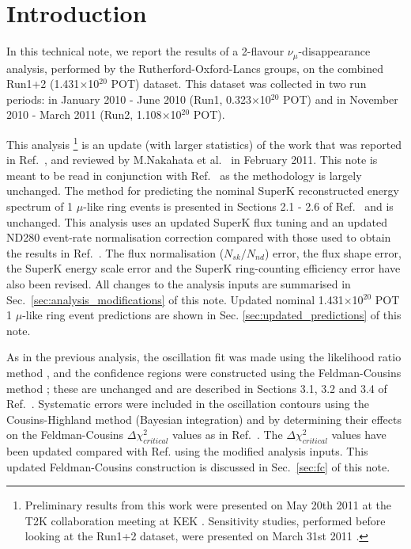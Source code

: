 \clearpage

\section {Introduction }
\label{sec:intro}

In this technical note, 
we report the results of a 2-flavour $\nu_{\mu}$-disappearance analysis,
performed by the Rutherford-Oxford-Lancs groups,	
on the combined Run1+2 (1.431$\times$10$^{20}$ POT) dataset.
This dataset was collected in two run periods:
in January 2010 - June 2010 (Run1, 0.323$\times$10$^{20}$ POT) and
in November 2010 - March 2011 (Run2, 1.108$\times$10$^{20}$ POT).

This analysis 
\footnote{
   Preliminary results from this work were presented on May 20th 2011
   at the T2K collaboration meeting at KEK \cite{OurPreliminaryResults}.
   Sensitivity studies, performed before looking at the Run1+2 dataset,
   were presented on March 31st 2011 \cite{OurSensitivityStudy}.
}
is an update (with larger statistics) of the work 
that was reported in Ref.\ \cite{OurRun1DisappAnalysis},
and reviewed by M.Nakahata et al.\ \cite{Run1DisappAnalysisReview} in February 2011.
This note is meant to be read in conjunction with Ref.\ \cite{OurRun1DisappAnalysis} as the methodology is largely unchanged.
The method for predicting the nominal SuperK reconstructed energy spectrum of 1 $\mu$-like ring events is presented 
in Sections 2.1 - 2.6 of Ref.\ \cite{OurRun1DisappAnalysis} and is unchanged.
This analysis uses an updated SuperK flux tuning and an updated 
ND280 event-rate normalisation correction compared with those used to obtain the results in Ref.\ \cite{OurRun1DisappAnalysis}.
The flux normalisation ($N_{sk}/N_{nd}$) error, the flux shape error, the SuperK energy scale error and the 
SuperK ring-counting efficiency error have also been revised.
All changes to the analysis inputs are summarised in Sec.\ \ref{sec:analysis_modifications} of this note.
Updated nominal 1.431$\times$10$^{20}$ POT 1 $\mu$-like ring event predictions are shown in 
Sec. \ref{sec:updated_predictions} of this note.

As in the previous analysis, the oscillation fit was made using the likelihood ratio method \cite{StatAnalysisCowan}, 
and the confidence regions were constructed using the Feldman-Cousins method \cite{FeldmanCousins}; 
these are unchanged and are described in 
Sections 3.1, 3.2 and 3.4 of Ref.\ \cite{OurRun1DisappAnalysis}.
Systematic errors were included in the oscillation contours 
using the Cousins-Highland method (Bayesian integration) and by determining their effects on the 
Feldman-Cousins $\Delta\chi^{2}_{critical}$ values as in Ref.\ \cite{OurRun1DisappAnalysis}.
The $\Delta\chi^{2}_{critical}$ values have been updated compared with Ref. \cite{OurRun1DisappAnalysis}
using the modified analysis inputs. This updated Feldman-Cousins construction is discussed in 
Sec.\ \ref{sec:fc} of this note.

